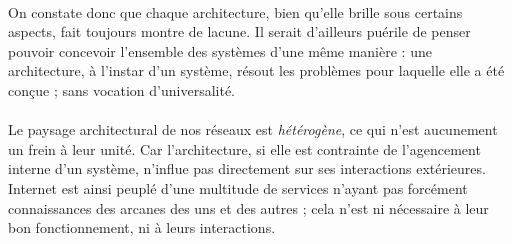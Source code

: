 \paragraph{} On constate donc que chaque architecture, bien qu'elle brille sous certains aspects, fait toujours montre de
lacune. Il serait d'ailleurs puérile de penser pouvoir concevoir l'ensemble des systèmes d'une même manière : une architecture,
à l'instar d'un système, résout les problèmes pour laquelle elle a été conçue ; sans vocation d'universalité.

\paragraph{} Le paysage architectural de nos réseaux est \emph{hétérogène}, ce qui n'est aucunement un frein à leur unité.
Car l'architecture, si elle est contrainte de l'agencement interne d'un système, n'influe pas directement sur ses interactions
extérieures. Internet est ainsi peuplé d'une multitude de services n'ayant pas forcément connaissances des arcanes des uns et
des autres ; cela n'est ni nécessaire à leur bon fonctionnement, ni à leurs interactions.